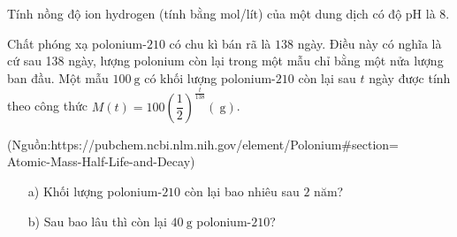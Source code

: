 \begin{bt}
	Tính nồng độ ion hydrogen (tính bằng mol/lít) của một dung dịch có độ pH là $8$.
\end{bt}

\begin{bt}
	Chất phóng xạ polonium-$210$ có chu kì bán rã là $138$ ngày. Điều này có nghĩa là cứ sau 138 ngày, lượng polonium còn lại trong một mẫu chỉ bằng một nửa lượng ban đầu. Một mẫu $100 \mathrm{~g}$ có khối lượng polonium-$210$ còn lại sau $t$ ngày được tính theo công thức $M(t)=100\left(\dfrac{1}{2}\right)^{\tfrac{t}{138}}(\mathrm{~g})$.
	\begin{flushright}
		(Nguồn:https://pubchem.ncbi.nlm.nih.gov/element/Polonium\#section=\\
		Atomic-Mass-Half-Life-and-Decay)
	\end{flushright}
	\begin{itemize}
		\item[a)] Khối lượng polonium-$210$ còn lại bao nhiêu sau $2$ năm?
		\item[b)] Sau bao lâu thì còn lại $40 \mathrm{~g}$ polonium-$210$?
	\end{itemize}
\end{bt}
